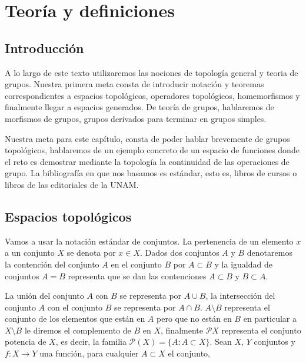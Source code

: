 




	

\tableofcontents

\chapter{Teoría y definiciones}

\section*{Introducción}
A lo largo de este texto utilizaremos las nociones de topología general y teoria de grupos. Nuestra primera meta consta de introducir notación y teoremas correspondientes a espacios topológicos, operadores topológicos, homemorfismos y finalmente llegar a espacios generados. De teoría de grupos, hablaremos de morfismos de grupos, grupos derivados para terminar en grupos simples. 

Nuestra meta para este capítulo, consta de poder hablar brevemente de grupos topológicos, hablaremos de un ejemplo concreto de un espacio de funciones donde el reto es demostrar mediante la topología la continuidad de las operaciones de grupo. La bibliografía en que nos basamos es estándar, esto es, libros de cursos o libros de las editoriales de la UNAM. 

\section{Espacios topológicos}
Vamos a usar la notación estándar de conjuntos. La pertenencia de un elemento $x$ a un conjunto $X$ se denota por $x \in X$. Dados dos conjuntos $A$ y $B$ denotaremos la contención del conjunto $A$ en el conjunto $B$ por $A \subset B$ y la igualdad de conjuntos $A=B$ representa que se dan las contenciones $A \subset B$ y $B \subset A$.

La unión del conjunto $A$ con $B$ se representa por $A \cup B$, la intersección del conjunto $A$ con el conjunto $B$ se representa por $A \cap B$. $A \setminus B$ representa el conjunto de los elementos que están en $A$ pero que no están en $B$ en particular a $X\setminus B$ le diremos el complemento de $B$ en $X$,  finalmente $\mathcal{P}X$ representa el conjunto potencia de $X$, es decir, la familia $\mathcal{P}(X)=\{A: A \subset X\}$.  Sean $X$, $Y$ conjuntos y $f:X \to Y$ una función, para cualquier $A \subset X$ el conjunto,
 
